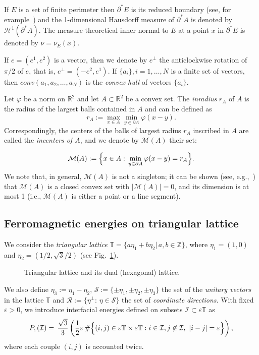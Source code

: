 \documentclass{interact}
\numberwithin{equation}{section}
\theoremstyle{definition}
\newcommand{\R}{\mathbb{R}}
\newcommand{\I}{\mathcal{I}}
\renewcommand{\epsilon}{\varepsilon}
\def\e{\epsilon}
\begin{document}
If $E$ is a set of finite perimeter then $\partial^*E$ is its reduced boundary (see, for example~\cite{Bra98}) and the 1-dimensional Hausdorff measure of $\partial^*A$ is denoted by $\mathcal{H}^1(\partial^*A)$. The 
measure-theoretical inner normal to $E$ at a point $x$ in $\partial^*E$ is denoted by $\nu=\nu_E(x).$

If $e=(e^1,e^2)$ is a vector, then we denote by $e^\perp$ the anticlockwise rotation of $\pi/2$ of $e$, that is, $e^\perp=(-e^2, e^1)$. If $\{a_i\}, i=1,\dots,N$ is a finite set of vectors, then $conv(a_1,a_2,\dots,a_N)$ is the \emph{convex hull} of vectors $\{a_i\}$.

Let $\varphi$ be a norm on $\R^2$ and let $A\subset\R^2$ be a convex set. The \emph{inradius} $r_A$ of $A$ is the radius of the largest balls contained in $A$ and can be defined as
\begin{equation*}
r_A:=\max_{x\in A}\min_{y\in\partial A}\varphi(x-y).
\end{equation*} 
Correspondingly, the centers of the balls of largest radius $r_A$ inscribed in $A$ are called the \emph{incenters of $A$}, and we denote by $\mathcal{M}(A)$ their set:

\begin{equation}
\mathcal{M}(A):=\Bigl\{x\in A:\, \min_{y\in\partial A}\varphi(x-y)=r_A\Bigr\}.
\label{kernel}
\end{equation}
We note that, in general, $\mathcal{M}(A)$ is not a singleton; it can be shown (see, e.g.,~\cite[Lemma~3.3]{BraMai}) that $\mathcal{M}(A)$ is a closed convex set with $|\mathcal{M}(A)|=0$, and its dimension is at most 1 (i.e., $\mathcal{M}(A)$ is either a point or a line segment).




\subsection{Ferromagnetic energies on triangular lattice}
We consider the \emph{triangular lattice} $\mathbb{T}=\{a\eta_1+b\eta_2|\, a,b\in\mathbb{Z}\}$, where $\eta_1=(1,0)$ and $\eta_2=(1/2,\sqrt{3}/2)$ (see Fig.~\ref{fig:0}). 
\begin{figure}[htbp]
\centering
\def\svgwidth{120pt}

\caption{Triangular lattice and its dual (hexagonal) lattice.}\label{fig:0}
\end{figure}
We also define $\eta_3:=\eta_1-\eta_2$, $\mathcal{S}:=\{\pm \eta_1,\pm\eta_2,\pm\eta_3\}$ the set of the \emph{unitary vectors} in the lattice $\mathbb{T}$ and $\mathcal{R}:=\{\eta^\perp:\, \eta\in\mathcal{S}\}$ the set of \emph{coordinate directions}. With fixed $\epsilon>0$, we introduce interfacial energies defined on subsets $\mathcal{I}\subset\epsilon\mathbb{T}$ as 
\begin{equation}
P_\e(\mathcal{I})= \,\frac{\sqrt 3}{3}\left(\frac{1}{2}\e\, \#\Bigl\{(i,j)\in\e\mathbb{T}\times\e\mathbb{T}: i\in \I, j\not\in \I, \ |i-j|=\e\Bigr\}\right),
\label{energies}
\end{equation}
where each couple $(i,j)$ is accounted twice. %
\end{document}
